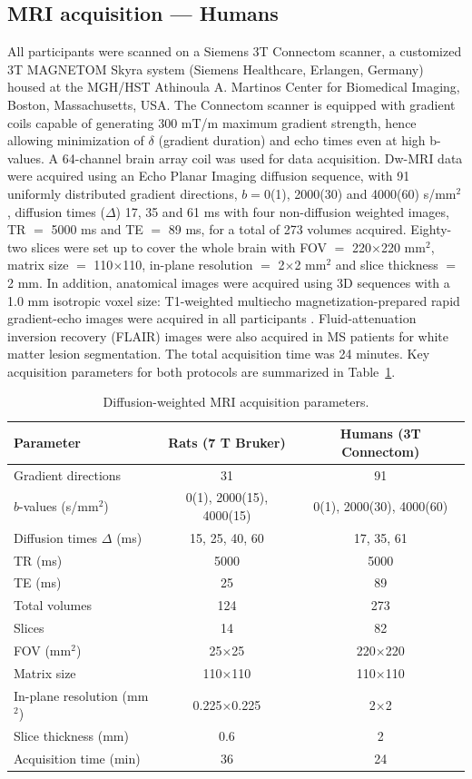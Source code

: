 \documentclass[11pt]{article}
\begin{document}
\subsection{MRI acquisition --- Humans}
All participants were scanned on a Siemens 3T Connectom scanner, a customized 3T MAGNETOM Skyra system (Siemens Healthcare, Erlangen, Germany) housed at the MGH/HST Athinoula A. Martinos Center for Biomedical Imaging, Boston, Massachusetts, USA. The Connectom scanner is equipped with gradient coils capable of generating 300 mT/m maximum gradient strength, hence allowing minimization of $\delta$ (gradient duration) and echo times even at high b-values. A 64-channel brain array coil \cite{Keil2013} was used for data acquisition. Dw-MRI data were acquired using an Echo Planar Imaging diffusion sequence, with 91 uniformly distributed gradient directions, $b=0$(1), 2000(30) and 4000(60) s/mm$^2$, diffusion times ($\Delta$) 17, 35 and 61 ms with four non-diffusion weighted images, TR $=$ 5000 ms and TE $=$ 89 ms, for a total of 273 volumes acquired. Eighty-two slices were set up to cover the whole brain with FOV $=$ 220$\times$220 mm$^2$, matrix size $=$ 110$\times$110, in-plane resolution $=$ 2$\times$2 mm$^2$ and slice thickness $=$ 2 mm. In addition, anatomical images were acquired using 3D sequences with a 1.0 mm isotropic voxel size: T1-weighted multiecho magnetization-prepared rapid gradient-echo images were acquired in all participants \cite{vanderKouwe2008}. Fluid-attenuation inversion recovery (FLAIR) images were also acquired in MS patients for white matter lesion segmentation. The total acquisition time was 24 minutes. Key acquisition parameters for both protocols are summarized in Table~\ref{tab:acquisition}.

\begin{table}[h]
\centering
\caption{Diffusion-weighted MRI acquisition parameters.}
\label{tab:acquisition}
\begin{tabular}{lcc}
\toprule
Parameter & Rats (7 T Bruker) & Humans (3T Connectom) \\
\midrule
Gradient directions & 31 & 91 \\
$b$-values (s/mm$^2$) & 0(1), 2000(15), 4000(15) & 0(1), 2000(30), 4000(60) \\
Diffusion times $\Delta$ (ms) & 15, 25, 40, 60 & 17, 35, 61 \\
TR (ms) & 5000 & 5000 \\
TE (ms) & 25 & 89 \\
Total volumes & 124 & 273 \\
Slices & 14 & 82 \\
FOV (mm$^2$) & 25$\times$25 & 220$\times$220 \\
Matrix size & 110$\times$110 & 110$\times$110 \\
In-plane resolution (mm$^2$) & 0.225$\times$0.225 & 2$\times$2 \\
Slice thickness (mm) & 0.6 & 2 \\
Acquisition time (min) & 36 & 24 \\
\bottomrule
\end{tabular}
\end{table}
\end{document}

